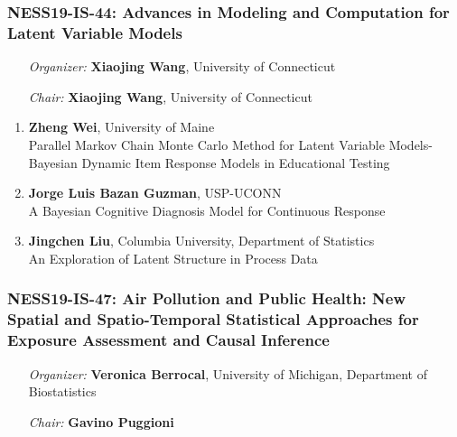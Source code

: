 \subsubsection*{NESS19-IS-44: Advances in Modeling and Computation for Latent Variable Models}

\begin{enumerate}[align=left]
\item [\emph{Organizer:}] \textbf{Xiaojing Wang}, University of Connecticut \\
\item [\emph{Chair:}] \textbf{Xiaojing Wang}, University of Connecticut
\end{enumerate}

\begin{enumerate}
\item \textbf{Zheng Wei}, University of Maine \\
Parallel Markov Chain Monte Carlo Method for Latent Variable Models-Bayesian Dynamic Item Response Models in Educational Testing
\item \textbf{Jorge Luis Bazan Guzman}, USP-UCONN \\
A Bayesian Cognitive Diagnosis Model for Continuous Response
\item \textbf{Jingchen Liu}, Columbia University, Department of Statistics \\
An Exploration of Latent Structure in Process Data
\end{enumerate}

\subsubsection*{NESS19-IS-47: Air Pollution and Public Health: New Spatial and Spatio-Temporal Statistical Approaches for Exposure Assessment and Causal Inference}

\begin{enumerate}[align=left]
\item [\emph{Organizer:}] \textbf{Veronica Berrocal}, University of Michigan, Department of Biostatistics \\
\item [\emph{Chair:}] \textbf{Gavino Puggioni}
\end{enumerate}

